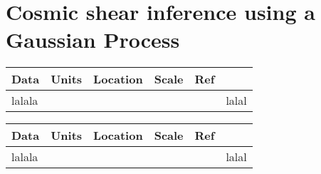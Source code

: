 \documentclass[ucdthesis.tex]{subfiles}
\begin{document}
    
    \doublespacing
		\setcounter{chapter}{3}
		\chapter{Cosmic shear inference using a Gaussian Process}{}{}
		\label{chapter4}

\begin{table}
\begin{center} 
\begin{tabular}{@{}lccccc}
\hline \hline Data & Units & Location & Scale & Ref \\ \hline
	lalala & & &&& lalal\\
\hline 
\end{tabular} 
\end{center} 
\end{table} 

\begin{table}
\begin{center} 
\begin{tabular}{@{}lccccc}
\hline \hline Data & Units & Location & Scale & Ref \\ \hline
	lalala & & &&& lalal\\
\hline 
\end{tabular} 
\end{center} 
\label{tab:inputs} 
\end{table} 
						 

        
\end{document}
